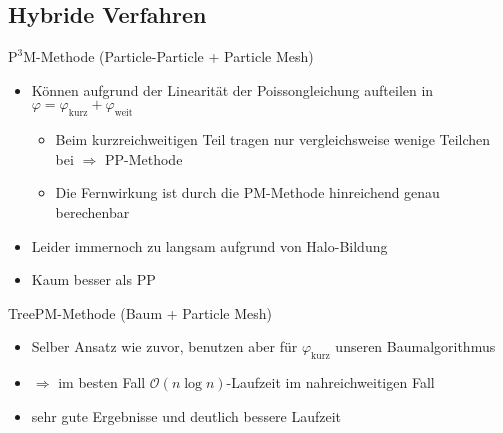 \documentclass{beamer}
\begin{document}
\subsection{Hybride Verfahren}
\begin{frame}{$\text{P}^3\text{M}$-Methode (Particle-Particle + Particle Mesh)}
  \begin{itemize}
    \item<1-> Können aufgrund der Linearität der Poissongleichung aufteilen in 
      $\varphi = \varphi_{\text{kurz}} + \varphi_{\text{weit}}$
      \vskip10pt
      \begin{itemize}
        \item<2-> Beim kurzreichweitigen Teil tragen nur vergleichsweise wenige
          Teilchen bei $\Rightarrow$ PP-Methode 
        \item<2-> Die Fernwirkung ist durch die PM-Methode hinreichend genau
          berechenbar
      \end{itemize}
      \vskip20pt
    \item<3-> Leider immernoch zu langsam aufgrund von Halo-Bildung \pause
    \item<4-> Kaum besser als PP
  \end{itemize}
\end{frame}

\begin{frame}{TreePM-Methode (Baum + Particle Mesh)}
  \begin{itemize}
    \item Selber Ansatz wie zuvor, benutzen aber für $\varphi_{\text{kurz}}$
      unseren Baumalgorithmus
      \vskip20pt
    \item $\Rightarrow$ im besten Fall $\mathcal{O}(n\log n)$-Laufzeit im
      nahreichweitigen Fall \pause
    \item sehr gute Ergebnisse und deutlich bessere Laufzeit
  \end{itemize}
\end{frame}
\end{document}
